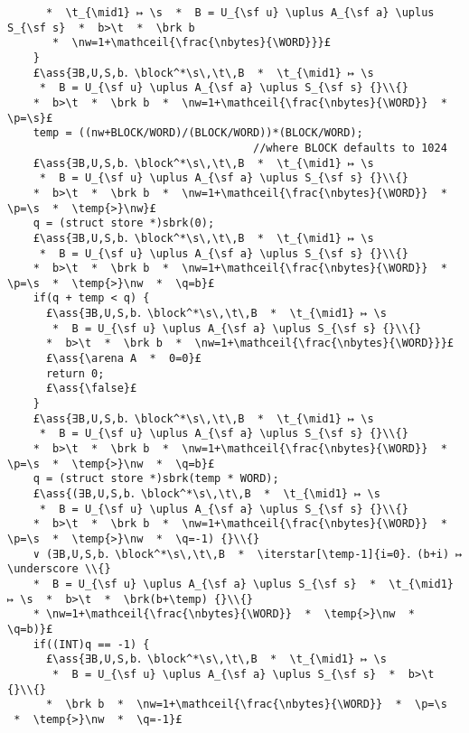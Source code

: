 \documentclass[12pt,a4paper]{article}
\makeatletter
\newcommand{\ml}[2][t]{\mbox{\mdseries\begin{tabular}[#1]{@{}L@{}}#2\end{tabular}}}
\newcommand{\ass}[1]{\ensuremath{{\color{blue}\left\{\ml[c]{#1}\right\}}}}
\newcommand{\iterstar}[2][]{\text{\LARGE $*$}^{#1}_{#2}}
\makeatother
\begin{document}
\begin{lstlisting}
      *  \t_{\mid1} ↦ \s  *  B = U_{\sf u} \uplus A_{\sf a} \uplus S_{\sf s}  *  b>\t  *  \brk b 
       *  \nw=1+\mathceil{\frac{\nbytes}{\WORD}}}£
    }
    £\ass{∃B,U,S,b．\block^*\s\,\t\,B  *  \t_{\mid1} ↦ \s 
     *  B = U_{\sf u} \uplus A_{\sf a} \uplus S_{\sf s} {}\\{}
    *  b>\t  *  \brk b  *  \nw=1+\mathceil{\frac{\nbytes}{\WORD}}  *  \p=\s}£
    temp = ((nw+BLOCK/WORD)/(BLOCK/WORD))*(BLOCK/WORD); 
                                      //where BLOCK defaults to 1024
    £\ass{∃B,U,S,b．\block^*\s\,\t\,B  *  \t_{\mid1} ↦ \s 
     *  B = U_{\sf u} \uplus A_{\sf a} \uplus S_{\sf s} {}\\{}
    *  b>\t  *  \brk b  *  \nw=1+\mathceil{\frac{\nbytes}{\WORD}}  *  \p=\s  *  \temp{>}\nw}£
    q = (struct store *)sbrk(0);
    £\ass{∃B,U,S,b．\block^*\s\,\t\,B  *  \t_{\mid1} ↦ \s 
     *  B = U_{\sf u} \uplus A_{\sf a} \uplus S_{\sf s} {}\\{}
    *  b>\t  *  \brk b  *  \nw=1+\mathceil{\frac{\nbytes}{\WORD}}  *  \p=\s  *  \temp{>}\nw  *  \q=b}£
    if(q + temp < q) {
      £\ass{∃B,U,S,b．\block^*\s\,\t\,B  *  \t_{\mid1} ↦ \s 
       *  B = U_{\sf u} \uplus A_{\sf a} \uplus S_{\sf s} {}\\{}
      *  b>\t  *  \brk b  *  \nw=1+\mathceil{\frac{\nbytes}{\WORD}}}£
      £\ass{\arena A  *  0=0}£
      return 0;
      £\ass{\false}£      
    }
    £\ass{∃B,U,S,b．\block^*\s\,\t\,B  *  \t_{\mid1} ↦ \s 
     *  B = U_{\sf u} \uplus A_{\sf a} \uplus S_{\sf s} {}\\{}
    *  b>\t  *  \brk b  *  \nw=1+\mathceil{\frac{\nbytes}{\WORD}}  *  \p=\s  *  \temp{>}\nw  *  \q=b}£
    q = (struct store *)sbrk(temp * WORD);
    £\ass{(∃B,U,S,b．\block^*\s\,\t\,B  *  \t_{\mid1} ↦ \s 
     *  B = U_{\sf u} \uplus A_{\sf a} \uplus S_{\sf s} {}\\{}
    *  b>\t  *  \brk b  *  \nw=1+\mathceil{\frac{\nbytes}{\WORD}}  *  \p=\s  *  \temp{>}\nw  *  \q=-1) {}\\{}
    ∨ (∃B,U,S,b．\block^*\s\,\t\,B  *  \iterstar[\temp-1]{i=0}．(b+i) ↦ \underscore \\{}
    *  B = U_{\sf u} \uplus A_{\sf a} \uplus S_{\sf s}  *  \t_{\mid1} ↦ \s  *  b>\t  *  \brk(b+\temp) {}\\{}
    * \nw=1+\mathceil{\frac{\nbytes}{\WORD}}  *  \temp{>}\nw  *  \q=b)}£
    if((INT)q == -1) {
      £\ass{∃B,U,S,b．\block^*\s\,\t\,B  *  \t_{\mid1} ↦ \s 
       *  B = U_{\sf u} \uplus A_{\sf a} \uplus S_{\sf s}  *  b>\t {}\\{}
      *  \brk b  *  \nw=1+\mathceil{\frac{\nbytes}{\WORD}}  *  \p=\s  *  \temp{>}\nw  *  \q=-1}£

\end{lstlisting}
\end{document}
